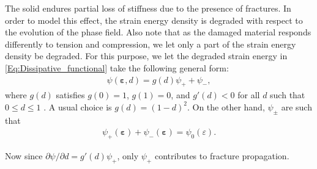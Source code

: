 

\begin{remark}\label{Rem:psi}
The solid endures partial loss of stiffness due to the presence of fractures. In order to model this {effect}, the strain energy density is degraded with respect to the evolution of {the} phase field. Also note that as the damaged material responds differently to tension and compression, we let only a part of the strain energy density be degraded. For this purpose, we let the degraded strain energy in \eqref{Eq:Dissipative_functional} take the following general form:
\begin{equation*}%
\begin{aligned}
\psi(\bm{\varepsilon}, d) = g(d)\psi_+ + \psi_-,
\end{aligned}
\end{equation*}
where $g(d)$ satisfies $g(0)=1$, $g(1)=0$, and $g'(d)<0$ for all $d$ such that $0\le d\le 1$ \cite{Bourdin2000797}. A usual choice is $g(d)=(1-d)^2$. On the other hand, $\psi_{\pm}$ are such that
\begin{equation*}
    \begin{aligned}
        \psi_+(\bm{\varepsilon})+\psi_-(\bm{\varepsilon})=\psi_0(\varepsilon).
    \end{aligned}
\end{equation*}

Now since $\partial\psi/\partial d=g'(d)\psi_+$, only $\psi_+$ contributes to fracture propagation. 
\end{remark}


